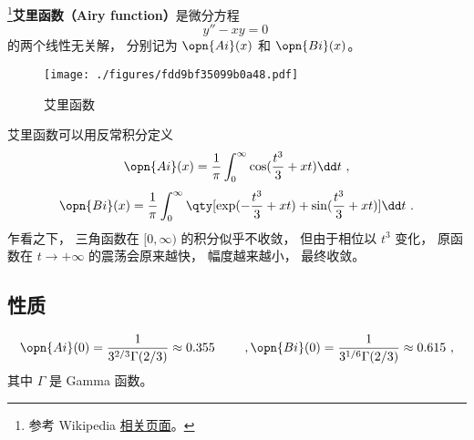 
\begin{issues}
\issueTODO
\end{issues}


\footnote{参考 Wikipedia \href{https://en.wikipedia.org/wiki/Airy_function}{相关页面}。}\textbf{艾里函数（Airy function）}是微分方程
\begin{equation}\label{eq_AiryF_2}
y'' - xy = 0~
\end{equation}
的两个线性无关解， 分别记为 $\opn{Ai}(x)$ 和 $\opn{Bi}(x)$。

\begin{figure}[ht]
\centering
\texttt{[image: ./figures/fdd9bf35099b0a48.pdf]}
\caption{艾里函数} \label{fig_AiryF_1}
\end{figure}

艾里函数可以用反常积分定义 %
\begin{equation}
\opn{Ai}(x)=\frac 1\pi \int_0^\infty \cos(\frac{t^3}{3}+xt)\dd t~,
\end{equation}
\begin{equation}
\opn{Bi}(x)=\frac 1\pi \int_0^\infty \qty[\exp(-\frac{t^3}{3}+xt)+\sin(\frac{t^3}{3}+xt)]\dd t~.
\end{equation}
乍看之下， 三角函数在 $[0,\infty)$ 的积分似乎不收敛， 但由于相位以 $t^3$ 变化， 原函数在 $t\to+\infty$ 的震荡会原来越快， 幅度越来越小， 最终收敛。


\subsection{性质}
\begin{equation}
\opn{Ai}(0) = \frac{1}{3^{2/3} \Gamma(2/3)} \approx 0.355
\qquad~,
\opn{Bi}(0) = \frac{1}{3^{1/6} \Gamma(2/3)} \approx 0.615~,
\end{equation}
其中 $\Gamma$ 是 Gamma 函数。

